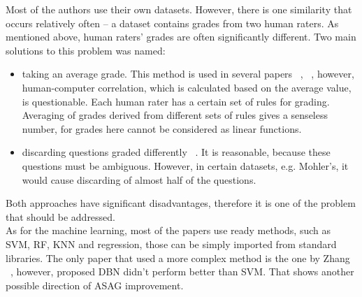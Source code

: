 Most of the authors use their own datasets. However, there is one similarity that occurs relatively often -- a dataset contains grades from two human raters. As mentioned above, human raters' grades are often significantly different. Two main solutions to this problem was named:

\begin{itemize}
\item taking an average grade. This method is used in several papers ~\cite{Mohler}, ~\cite{Sultan}, however, human-computer correlation, which is calculated based on the average value, is questionable. Each human rater has a certain set of rules for grading. Averaging of grades derived from different sets of rules gives a senseless number, for grades here cannot be considered as linear functions. 
\item discarding questions graded differently ~\cite{Zbontar}. It is reasonable, because these questions must be ambiguous. However, in certain datasets, e.g. Mohler's, it would cause discarding of almost half of the questions.
\end{itemize}

Both approaches have significant disadvantages, therefore it is one of the problem that should be addressed.\\

As for the machine learning, most of the papers use ready methods, such as SVM, RF, KNN and regression, those can be simply imported from standard libraries. The only paper that used a more complex method is the one by Zhang ~\cite{Zhang}, however, proposed DBN didn't perform better than SVM. That shows another possible direction of ASAG improvement.